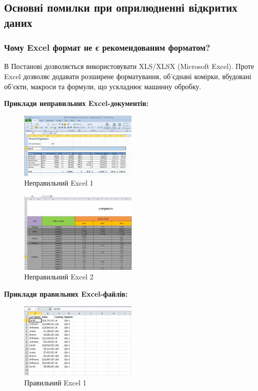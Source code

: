 \subsection{Основні помилки при оприлюдненні відкритих даних}

\subsubsection{Чому Excel формат не є рекомендованим форматом?}

В Постанові дозволяється використовувати XLS/XLSX (Microsoft Excel). Проте Excel дозволяє додавати розширене форматування, об’єднані комірки, вбудовані об’єкти, макроси та формули, що ускладнює машинну обробку.

\textbf{Приклади неправильних Excel-документів:}

\begin{figure}[h]
    \centering
    \includegraphics[width=0.5\textwidth]{images/004.gif}
    \caption{Неправильний Excel 1}
\end{figure}

\begin{figure}[h]
    \centering
    \includegraphics[width=0.5\textwidth]{images/005.gif}
    \caption{Неправильний Excel 2}
\end{figure}

\textbf{Приклади правильних Excel-файлів:}

\begin{figure}[h]
    \centering
    \includegraphics[width=0.5\textwidth]{images/006.gif}
    \caption{Правильний Excel 1}
\end{figure}


